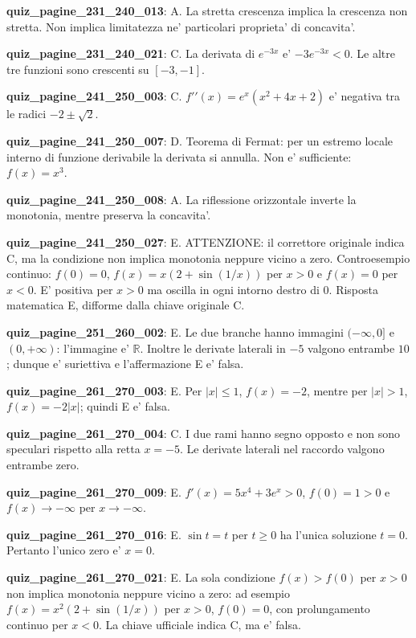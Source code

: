 \documentclass[11pt,a4paper]{article}
\newcounter{quiz}
\begin{document}
\noindent\textbf{quiz\_pagine\_231\_240\_013}: A. La stretta crescenza implica la crescenza non stretta. Non implica limitatezza ne' particolari proprieta' di concavita'.\par\medskip
\noindent\textbf{quiz\_pagine\_231\_240\_021}: C. La derivata di $e^{-3x}$ e' $-3e^{-3x}<0$. Le altre tre funzioni sono crescenti su $[-3,-1]$.\par\medskip
\noindent\textbf{quiz\_pagine\_241\_250\_003}: C. $f\prime\prime(x)=e^x(x^2+4x+2)$ e' negativa tra le radici $-2\pm\sqrt2$.\par\medskip
\noindent\textbf{quiz\_pagine\_241\_250\_007}: D. Teorema di Fermat: per un estremo locale interno di funzione derivabile la derivata si annulla. Non e' sufficiente: $f(x)=x^3$.\par\medskip
\noindent\textbf{quiz\_pagine\_241\_250\_008}: A. La riflessione orizzontale inverte la monotonia, mentre preserva la concavita'.\par\medskip
\noindent\textbf{quiz\_pagine\_241\_250\_027}: E. ATTENZIONE: il correttore originale indica C, ma la condizione non implica monotonia neppure vicino a zero. Controesempio continuo: $f(0)=0$, $f(x)=x(2+\sin(1/x))$ per $x>0$ e $f(x)=0$ per $x<0$. E' positiva per $x>0$ ma oscilla in ogni intorno destro di 0. Risposta matematica E, difforme dalla chiave originale C.\par\medskip
\noindent\textbf{quiz\_pagine\_251\_260\_002}: E. Le due branche hanno immagini $(-\infty,0]$ e $(0,+\infty)$: l'immagine e' $\mathbb R$. Inoltre le derivate laterali in $-5$ valgono entrambe $10$; dunque e' suriettiva e l'affermazione E e' falsa.\par\medskip
\noindent\textbf{quiz\_pagine\_261\_270\_003}: E. Per $|x|\leq1$, $f(x)=-2$, mentre per $|x|>1$, $f(x)=-2|x|$; quindi E e' falsa.\par\medskip
\noindent\textbf{quiz\_pagine\_261\_270\_004}: C. I due rami hanno segno opposto e non sono speculari rispetto alla retta $x=-5$. Le derivate laterali nel raccordo valgono entrambe zero.\par\medskip
\noindent\textbf{quiz\_pagine\_261\_270\_009}: E. $f'(x)=5x^4+3e^x>0$, $f(0)=1>0$ e $f(x)\to-\infty$ per $x\to-\infty$.\par\medskip
\noindent\textbf{quiz\_pagine\_261\_270\_016}: E. $\sin t=t$ per $t\geq0$ ha l'unica soluzione $t=0$. Pertanto l'unico zero e' $x=0$.\par\medskip
\noindent\textbf{quiz\_pagine\_261\_270\_021}: E. La sola condizione $f(x)>f(0)$ per $x>0$ non implica monotonia neppure vicino a zero: ad esempio $f(x)=x^2(2+\sin(1/x))$ per $x>0$, $f(0)=0$, con prolungamento continuo per $x<0$. La chiave ufficiale indica C, ma e' falsa.\par\medskip
\end{document}
